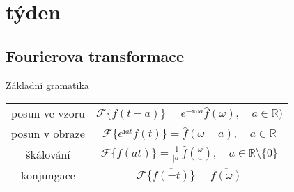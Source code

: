 \documentclass{article}
\newcommand{\mi}{\mathrm{i}}
\begin{document}
    \section{týden}%
        \subsection{Fourierova transformace}
        Základní gramatika
        \begin{center}
            \begin{tabular}{|c|c|}
                \hline
                posun ve vzoru& $\mathcal{F}\{f(t-a)\}=e^{-\mi\omega a}\hat{f}(\omega),\quad a\in\mathbb{R})$ \\
                posun v obraze&  $\mathcal{F}\{e^{\mi at}f(t)\}=\hat{f}(\omega-a), \quad a\in \mathbb{R}$\\
                škálování& $\mathcal{F}\{f(at)\}=\frac{1}{|a|}\hat{f}\left(\frac{\omega}{a}\right),\quad a\in\mathbb{R}\setminus\{0\}$\\
                konjungace& $\mathcal{F}\{\overline{f(-t)}\}=\overline{f(\omega)}$ \\
                \hline
            \end{tabular}
        \end{center}
\end{document}
